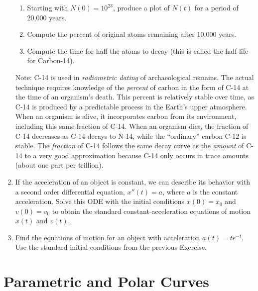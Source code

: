 \documentclass[10.5pt,twoside]{report}
\theoremstyle{definition}
\begin{document}
\begin{enumerate}
 \begin{enumerate}

  \item Starting with $N(0)=10^{23}$, produce a plot of $N(t)$ for a period of 20,000 years.  
  
  \item Compute the percent of original atoms remaining after 10,000 years.  
  
  \item Compute the time for half the atoms to decay (this is called the half-life for Carbon-14).

 \end{enumerate}
 
 Note:  C-14 is used in \textit{radiometric dating} of archaeological remains.  The actual technique requires knowledge of the \textit{percent} of carbon in the form of C-14 at the time of an organism's death.  This percent is relatively stable over time, as C-14 is produced by a predictable process in the Earth's upper atmosphere.  When an organism is alive, it incorporates carbon from its environment, including this same fraction of C-14.  When an organism dies, the fraction of C-14 decreases as C-14 decays to N-14, while the ``ordinary'' carbon C-12 is stable.  The \textit{fraction} of C-14 follows the same decay curve as the \textit{amount} of C-14 to a very good approximation because C-14 only occurs in trace amounts (about one part per trillion).  

\item If the acceleration of an object is constant, we can describe its behavior with a second order differential equation, $x''(t)=a$, where $a$ is the constant acceleration. Solve this ODE with the initial conditions $x(0)=x_0$ and $v(0)=v_0$ to obtain the standard constant-acceleration equations of motion $x(t)$ and $v(t)$.

\item Find the equations of motion for an object with acceleration $a(t)=te^{-t}$.  Use the standard initial conditions from the previous Exercise.


\end{enumerate}

\pagebreak


\chapter{Parametric and Polar Curves}

\vspace*{\fill}
\end{document}
